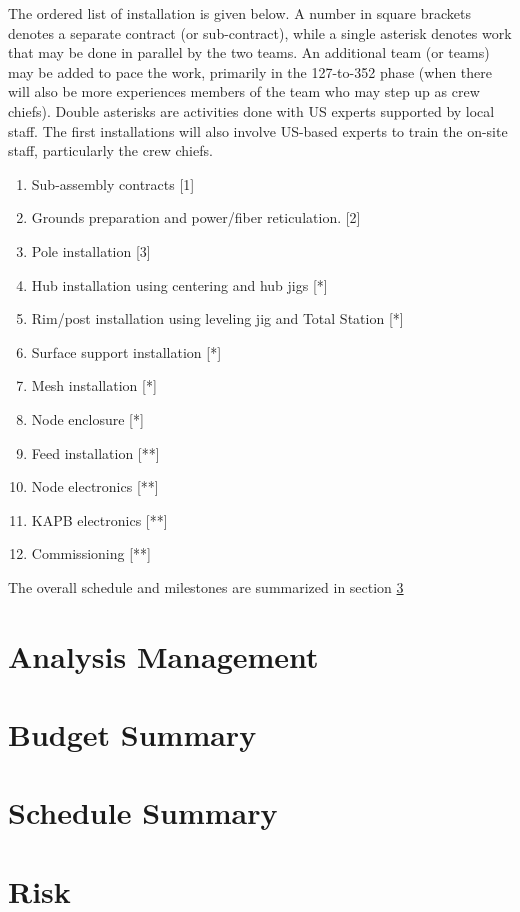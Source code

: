 \documentclass[preprint]{aastex}
\begin{document}
The ordered list of installation is given below.  A number in square brackets denotes a separate contract (or sub-contract),
while a single asterisk denotes work that may be done in parallel by the two teams.  An additional team (or teams) may be 
added to pace the work, primarily in the 127-to-352 phase (when there will also be more experiences members of the team
who may step up as crew chiefs).  Double asterisks are activities done with US experts supported by local staff.  The first
installations will also involve US-based experts to train the on-site staff, particularly the crew chiefs.
\begin{enumerate}[itemsep=-3pt]
\item Sub-assembly contracts [1]
\item Grounds preparation and power/fiber reticulation. [2]
\item Pole installation [3]
\item Hub installation using centering and hub jigs  [*]
\item Rim/post installation using leveling jig and Total Station [*]
\item Surface support installation [*]
\item Mesh installation [*]
\item Node enclosure [*]
\item Feed installation [**]
\item Node electronics [**]
\item KAPB electronics [**]
\item Commissioning [**]
\end{enumerate}

The overall schedule and milestones are summarized in section \ref{sec:schedule}


\section{Analysis Management}
\label{sec:analysis}

\section{Budget Summary}
\label{sec:budget}




\section{Schedule Summary}
\label{sec:schedule}

\section{Risk}
\label{sec:risk}
\end{document}
